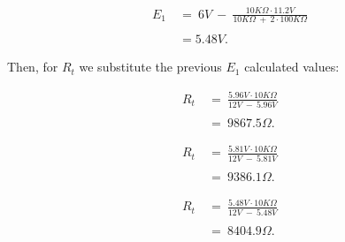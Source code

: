 {\bfseries\itshape{}} 

\begin{ceqn}
\begin{align*}
E_{1}\ &=\ 6 V\ -\ \frac{10K\Omega \cdot 11.2 V}{10K\Omega\ +\ 2 \cdot 100K\Omega} \\ \\
&= 5.48 V.
\end{align*}
\end{ceqn} \hfill \break

Then, for $R_{t}$ we substitute the previous $E_{1}$ calculated values: \hfill \break

{\bfseries\itshape{}} 

\begin{ceqn}
\begin{align*}
R_{t}\ &=\ \frac{5.96 V \cdot 10K\Omega}{12V\ -\ 5.96 V} \\ \\
&=\ 9867.5\Omega.
\end{align*}
\end{ceqn} \hfill \break

{\bfseries\itshape{}} 

\begin{ceqn}
\begin{align*}
R_{t}\ &=\ \frac{5.81 V \cdot 10K\Omega}{12V\ -\ 5.81 V} \\ \\
&=\ 9386.1\Omega.
\end{align*}
\end{ceqn} \hfill \break

{\bfseries\itshape{}} 

\begin{ceqn}
\begin{align*}
R_{t}\ &=\ \frac{5.48 V \cdot 10K\Omega}{12V\ -\ 5.48 V} \\ \\
&=\ 8404.9\Omega.
\end{align*}
\end{ceqn} \hfill \break

\pagebreak